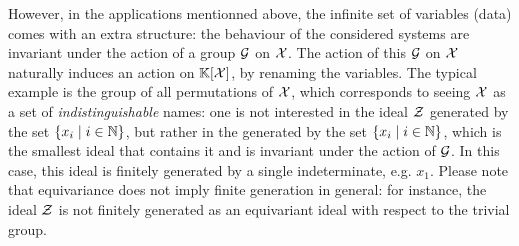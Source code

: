 \AP However, in the applications mentionned above, the infinite set of
variables (data) comes with an extra structure: the behaviour of the considered
systems are invariant under the action of a group $\mathcal{G}$ on $\mathcal{X}$. The action
of this $\mathcal{G}$ on $\mathcal{X}$ naturally induces an action on $\mathbb{K}[\mathcal{X}]$, by
renaming the variables. The typical example is the group of all permutations of
$\mathcal{X}$, which corresponds to seeing $\mathcal{X}$ as a set of \emph{indistinguishable}
names: one is not interested in the ideal $\mathcal{Z}$ generated by the set
$\{ x_i \mid i \in \mathbb{N} \}$, but rather in the  generated by
the set $\{ x_i \mid i \in \mathbb{N} \}$, which is the smallest ideal that contains it
and is invariant under the action of $\mathcal{G}$. In this case, this ideal is
finitely generated by a single indeterminate, e.g. $x_1$. Please note that
equivariance does not imply finite generation in general: for instance, the
ideal $\mathcal{Z}$ is not finitely generated as an equivariant ideal with respect to
the trivial group.
%

